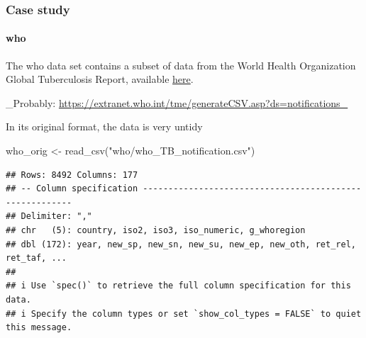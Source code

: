 \documentclass[
]{article}
\newenvironment{Shaded}{\begin{snugshade}}{\end{snugshade}}
\newcommand{\FunctionTok}[1]{\textcolor[rgb]{0.00,0.00,0.00}{#1}}
\newcommand{\NormalTok}[1]{#1}
\newcommand{\OtherTok}[1]{\textcolor[rgb]{0.56,0.35,0.01}{#1}}
\newcommand{\StringTok}[1]{\textcolor[rgb]{0.31,0.60,0.02}{#1}}
\begin{document}
\hypertarget{case-study}{%
\subsubsection{Case study}\label{case-study}}

\hypertarget{who}{%
\paragraph{who}\label{who}}

The who data set contains a subset of data from the World Health
Organization Global Tuberculosis Report, available
\href{https://www.who.int/teams/global-tuberculosis-programme/data}{here}.

\_Probably:
\url{https://extranet.who.int/tme/generateCSV.asp?ds=notifications_}

In its original format, the data is very untidy

\begin{Shaded}
\begin{Highlighting}[]
\NormalTok{who\_orig }\OtherTok{\textless{}{-}} \FunctionTok{read\_csv}\NormalTok{(}\StringTok{"who/who\_TB\_notification.csv"}\NormalTok{)}
\end{Highlighting}
\end{Shaded}

\begin{verbatim}
## Rows: 8492 Columns: 177
## -- Column specification --------------------------------------------------------
## Delimiter: ","
## chr   (5): country, iso2, iso3, iso_numeric, g_whoregion
## dbl (172): year, new_sp, new_sn, new_su, new_ep, new_oth, ret_rel, ret_taf, ...
## 
## i Use `spec()` to retrieve the full column specification for this data.
## i Specify the column types or set `show_col_types = FALSE` to quiet this message.
\end{verbatim}
\end{document}
